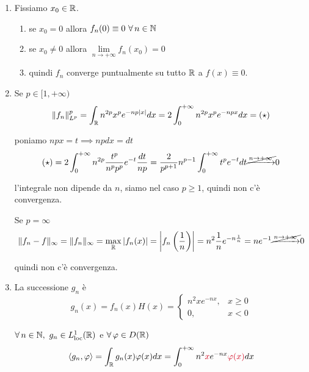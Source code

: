 \begin{enumerate}
\item Fissiamo $x_{0} \in \mathbb{R} $.
\begin{enumerate}
\item se $x_{0} = 0$ allora $f_{n}(0) \equiv 0\ \forall n\in \NN $
\item se $x_{0} \neq 0$ allora $\lim\limits_{n\rightarrow + \infty} f_{n}(x_{0}) = 0$
\item quindi $f_{n}$ converge puntualmente su tutto $\mathbb{R} $ a $f(x) \equiv 0$.
\end{enumerate}

\item Se $p\in [ 1, + \infty)$
\begin{equation*}
\Vert f_{n}\Vert^{p}_{L^{p}} = \int_{\mathbb{R}} n^{2p} x^{p} e^{- np| x|} dx = 2\int^{+ \infty}_{0} n^{2p} x^{p} e^{- npx} dx = (\star)
\end{equation*}

poniamo $npx = t\implies npdx = dt$
\begin{equation*}
(\star) = 2\int^{+ \infty}_{0} n^{2p}\frac{t^{p}}{n^{p} p^{p}} e^{- t}\frac{dt}{np} = \frac{2}{p^{p + 1}} n^{p - 1}\int^{+ \infty}_{0} t^{p} e^{- t} dt\cancel{\xrightarrow{n\rightarrow + \infty}} 0
\end{equation*}

l'integrale non dipende da $n$, siamo nel caso $p \geq 1$, quindi non c'è convergenza.

Se $p = \infty $
\begin{equation*}
\Vert f_{n} - f\Vert_{\infty} = \Vert f_{n}\Vert_{\infty} = \max_{\mathbb{R}}| f_{n}(x)| = \left| f_{n}\left(\frac{1}{n}\right)\right| = n^{2}\frac{1}{n} e^{- n\frac{1}{n}} = ne^{- 1}\cancel{\xrightarrow{n\rightarrow + \infty}} 0
\end{equation*}

quindi non c'è convergenza.
\item La successione $g_{n}$ è
\begin{equation*}
g_{n}(x) = f_{n}(x) H(x) =
\begin{cases}
n^{2} xe^{- nx}, & x \geq 0\\
0, & x < 0
\end{cases}
\end{equation*}

$\forall n\in \NN, \ g_{n} \in L^{1}_{\loc}(\RR)$ e $\forall \varphi \in D(\RR)$
\begin{equation*}
\langle g_{n}, \varphi \rangle = \int_{\RR} g_{n}(x) \varphi (x) dx = \int^{+ \infty}_{0} n^{2}\textcolor[rgb]{0.82, 0.01, 0.11}{x} e^{- nx}\textcolor[rgb]{0.82, 0.01, 0.11}{\varphi}\textcolor[rgb]{0.82, 0.01, 0.11}{(}\textcolor[rgb]{0.82, 0.01, 0.11}{x}\textcolor[rgb]{0.82, 0.01, 0.11}{)} dx
\end{equation*}


\end{enumerate}
